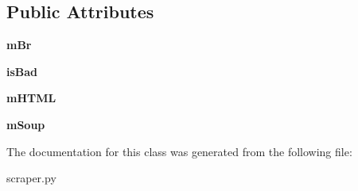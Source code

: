 \subsection*{Public Attributes}
\begin{DoxyCompactItemize}
\item 
\hypertarget{classscraper_1_1Scraper_a29f1b1abf2adaea2fe782622748a00df}{{\bfseries m\-Br}}\label{classscraper_1_1Scraper_a29f1b1abf2adaea2fe782622748a00df}

\item 
\hypertarget{classscraper_1_1Scraper_a72e792b3ed75c00315b515da29244a37}{{\bfseries is\-Bad}}\label{classscraper_1_1Scraper_a72e792b3ed75c00315b515da29244a37}

\item 
\hypertarget{classscraper_1_1Scraper_ac5b7229df7b2f0589ea1fe8651e71cc1}{{\bfseries m\-H\-T\-M\-L}}\label{classscraper_1_1Scraper_ac5b7229df7b2f0589ea1fe8651e71cc1}

\item 
\hypertarget{classscraper_1_1Scraper_a97c7efed94f7b2119db66b52cc749457}{{\bfseries m\-Soup}}\label{classscraper_1_1Scraper_a97c7efed94f7b2119db66b52cc749457}

\end{DoxyCompactItemize}


The documentation for this class was generated from the following file\-:\begin{DoxyCompactItemize}
\item 
scraper.\-py\end{DoxyCompactItemize}
